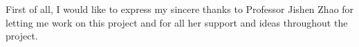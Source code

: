 \documentclass[11pt]{cover_page}
\begin{document}
\begin{frontmatter}
\begin{abstract}
\end{abstract}

\begin{acknowledgements}
First of all, I would like to express my sincere thanks to Professor Jishen Zhao for letting me work on this project and for all her support and ideas throughout the project.\\\\

\end{acknowledgements}

\end{frontmatter}
\end{document}
